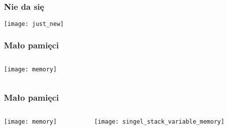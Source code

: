 \documentclass{beamer}
\begin{document}
\begin{frame}
    \frametitle{Nie da się}
    \begin{center}
        \texttt{[image: just\_new]}
    \end{center}
\end{frame}
\begin{frame}[t]
    \frametitle{Mało pamięci}
    \begin{columns}[t]
        \begin{column}{0.5\textwidth}
            \begin{center}
                \texttt{[image: memory]}\\
                \tiny \cite{memory} 
            \end{center}
        \end{column}
        \begin{column}[t]{0.5\textwidth}
        \end{column}
    \end{columns}
\end{frame}
\begin{frame}[t]
    \frametitle{Mało pamięci}
    \begin{columns}[t]
        \begin{column}{0.5\textwidth}
            \begin{center}
                \texttt{[image: memory]}\\
                \tiny \cite{memory} 
            \end{center}
        \end{column}
        \begin{column}[t]{0.5\textwidth}
            \begin{center}
                \texttt{[image: singel\_stack\_variable\_memory]}
            \end{center}
        \end{column}
    \end{columns}
\end{frame}
\end{document}
